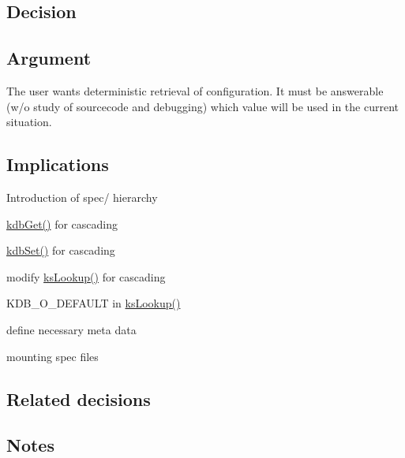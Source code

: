 \subsection*{Decision}

\subsection*{Argument}


\begin{DoxyItemize}
\item The user wants deterministic retrieval of configuration. It must be answerable (w/o study of sourcecode and debugging) which value will be used in the current situation.
\end{DoxyItemize}

\subsection*{Implications}


\begin{DoxyEnumerate}
\item Introduction of spec/ hierarchy
\item \hyperlink{group__kdb_ga28e385fd9cb7ccfe0b2f1ed2f62453a1}{kdb\+Get()} for cascading
\item \hyperlink{group__kdb_ga11436b058408f83d303ca5e996832bcf}{kdb\+Set()} for cascading
\item modify \hyperlink{group__keyset_gaa34fc43a081e6b01e4120daa6c112004}{ks\+Lookup()} for cascading
\item K\+D\+B\+\_\+\+O\+\_\+\+D\+E\+F\+A\+U\+L\+T in \hyperlink{group__keyset_gaa34fc43a081e6b01e4120daa6c112004}{ks\+Lookup()}
\item define necessary meta data
\item mounting spec files
\end{DoxyEnumerate}

\subsection*{Related decisions}

\subsection*{Notes}